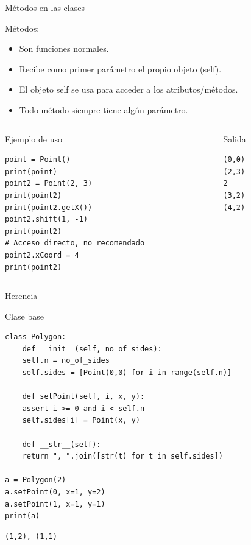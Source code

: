 \documentclass[bigger,unknownkeysallowed]{beamer}
\begin{document}
\begin{frame}[fragile,label={sec:org61ab6eb}]{Métodos en las clases}
 \begin{block}{Métodos:}
\begin{itemize}
\item Son funciones normales.

\item Recibe como primer parámetro el propio objeto (self).

\item El objeto self se usa para acceder a los atributos/métodos.

\item Todo método siempre tiene algún parámetro.
\end{itemize}
\end{block}

\begin{columns}
\begin{column}{0.6\columnwidth}
\begin{exampleblock}{Ejemplo de uso}
\begin{verbatim}
point = Point()
print(point)
point2 = Point(2, 3)
print(point2)
print(point2.getX())
point2.shift(1, -1)
print(point2)
# Acceso directo, no recomendado
point2.xCoord = 4
print(point2)
\end{verbatim}
\end{exampleblock}
\end{column}

\begin{column}{0.3\columnwidth}
\begin{block}{Salida}
\scriptsize
\begin{verbatim}
(0,0)
(2,3)
2
(3,2)
(4,2)
\end{verbatim}
\end{block}
\end{column}
\end{columns}
\end{frame}



\begin{frame}[fragile,label={sec:org037767f}]{Herencia}
 \begin{block}{Clase base}
\begin{verbatim}
class Polygon:
    def __init__(self, no_of_sides):
	self.n = no_of_sides
	self.sides = [Point(0,0) for i in range(self.n)]

    def setPoint(self, i, x, y):
	assert i >= 0 and i < self.n
	self.sides[i] = Point(x, y)

    def __str__(self):
	return ", ".join([str(t) for t in self.sides])

a = Polygon(2)
a.setPoint(0, x=1, y=2)
a.setPoint(1, x=1, y=1)
print(a)
\end{verbatim}
\scriptsize
\begin{verbatim}
(1,2), (1,1)
\end{verbatim}
\end{block}
\end{frame}
\end{document}
